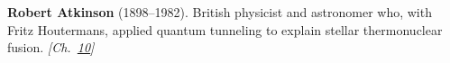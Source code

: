 \textbf{Robert Atkinson} (1898–1982). British physicist and astronomer who, with Fritz Houtermans, applied quantum tunneling to explain stellar thermonuclear fusion. \emph{[Ch.~\hyperref[ch:solarfusionquantumtunneling]{10}]}

